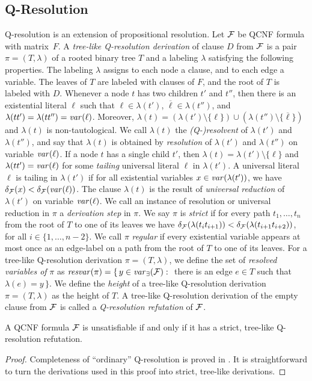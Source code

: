 \documentclass{llncs}
\def\hy{\hbox{-}\nobreak\hskip0pt} \newcommand{\ellipsis}{$\dots$}
\newcommand{\SB}{\{\,} \newcommand{\SM}{\;{:}\;} \newcommand{\SE}{\,\}}
\begin{document}
\subsection{Q\hy Resolution}
Q\hy resolution \cite{KleinebuningKarpinskiFlogel95} is an extension of
propositional resolution. Let $\mathcal{F}$ be QCNF formula with matrix~$F$. A
\emph{tree-like Q\hy resolution derivation} of clause $D$ from $\mathcal{F}$ is a
pair $\pi = (T,\lambda)$ of a rooted binary tree $T$ and a labeling $\lambda$
satisfying the following properties. The labeling $\lambda$ assigns to each
node a clause, and to each edge a variable. The leaves of $T$ are labeled with
clauses of $F$, and the root of $T$ is labeled with $D$. Whenever a node $t$
has two children $t'$ and $t''$, then there is an existential literal $\ell$
such that $\ell \in \lambda(t')$, $\overline{\ell} \in \lambda(t'')$, and
$\lambda(tt') = \lambda(tt'') = \mathit{var}(\ell)$. Moreover, $\lambda(t) =
(\lambda(t') \setminus \{\ell\}) \cup (\lambda(t'')
\setminus\{\overline{\ell}\})$ and $\lambda(t)$ is non-tautological. We call
$\lambda(t)$ the \emph{(Q-)resolvent} of $\lambda(t')$ and $\lambda(t'')$, and
say that $\lambda(t)$ is obtained by \emph{resolution} of $\lambda(t')$ and
$\lambda(t'')$ on variable $\mathit{var}(\ell)$. If a node $t$ has a single child
$t'$, then $\lambda(t) = \lambda(t')\setminus \{\ell\}$ and $\lambda(tt') =
\mathit{var}(\ell)$ for some \emph{tailing} universal literal $\ell$ in
$\lambda(t')$. A universal literal $\ell$ is tailing in $\lambda(t')$ if for
all existential variables $x \in \mathit{var}(\lambda(t'))$, we have $\delta_{\mathcal{F}}(x)
< \delta_{\mathcal{F}}(\mathit{var}(\ell))$. The clause $\lambda(t)$ is the result of
\emph{universal reduction} of $\lambda(t')$ on variable $\mathit{var}(\ell)$. We call
an instance of resolution or universal reduction in $\pi$ a \emph{derivation
  step} in $\pi$. We say $\pi$ is \emph{strict} if for every path $t_1,\dots,
t_n$ from the root of $T$ to one of its leaves we have
$\delta_{\mathcal{F}}(\lambda(t_it_{i+1})) < \delta_{\mathcal{F}}(\lambda(t_{i+1}t_{i+2}))$,
for all $i \in \{1,\dots,n - 2\}$.  We call $\pi$ \emph{regular} if every
existential variable appears at most once as an edge-label on a path from the
root of $T$ to one of its leaves. For a tree\hy like Q\hy resolution
derivation $\pi = (T,\lambda)$, we define the set of \emph{resolved variables
  of} $\pi$ as $\mathit{resvar}(\pi) = \SB y \in \var_{\exists}(\FFF) \SM$
there is an edge $e \in T$ such that $\lambda(e) = y \SE$. We define the
\emph{height} of a tree\hy like Q\hy resolution derivation $\pi = (T,\lambda)$
as the height of $T$. A tree\hy like Q\hy resolution derivation of the empty
clause from $\mathcal{F}$ is called a \emph{Q\hy resolution refutation} of $\mathcal{F}$.
\begin{theorem}\label{ThmStrictQres}A QCNF formula $\mathcal{F}$ is unsatisfiable if and only if it has a
  strict, tree-like Q\hy resolution refutation.
\end{theorem}
\begin{proof}
  Completeness of ``ordinary'' Q-resolution is proved in
  \cite{KleinebuningKarpinskiFlogel95}. It is straightforward to turn the
  derivations used in this proof into strict, tree\hy like derivations.
\end{proof}
\end{document}

